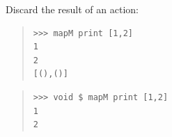 \begin{haddockdesc}
{\begin{quote}
{\begin{verbatim}
\end{verbatim}}
\end{quote}
Discard the result of an  action:\par
\begin{quote}
{\haddockverb\begin{verbatim}
>>> mapM print [1,2]
1
2
[(),()]

\end{verbatim}}
\end{quote}
\begin{quote}
{\haddockverb\begin{verbatim}
>>> void $ mapM print [1,2]
1
2

\end{verbatim}}
\end{quote}}
\end{haddockdesc}
